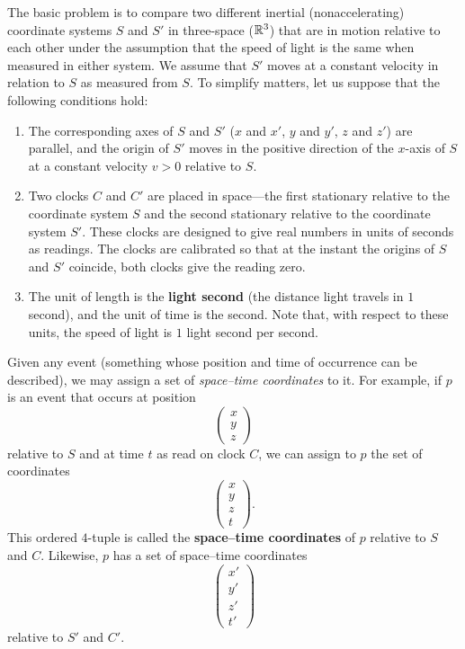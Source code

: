 \begin{defn}\label{6.9.1}
  The basic problem is to compare two different inertial (nonaccelerating) coordinate systems \(S\) and \(S'\) in three-space (\(\mathbb{R}^3\)) that are in motion relative to each other under the assumption that the speed of light is the same when measured in either system.
  We assume that \(S'\) moves at a constant velocity in relation to \(S\) as measured from \(S\).
  To simplify matters, let us suppose that the following conditions hold:
  \begin{enumerate}
    \item The corresponding axes of \(S\) and \(S'\) (\(x\) and \(x'\), \(y\) and \(y'\), \(z\) and \(z'\)) are parallel, and the origin of \(S'\) moves in the positive direction of the \(x\)-axis of \(S\) at a constant velocity \(v > 0\) relative to \(S\).
    \item Two clocks \(C\) and \(C'\) are placed in space---the first stationary relative to the coordinate system \(S\) and the second stationary relative to the coordinate system \(S'\).
          These clocks are designed to give real numbers in units of seconds as readings.
          The clocks are calibrated so that at the instant the origins of \(S\) and \(S'\) coincide, both clocks give the reading zero.
    \item The unit of length is the \textbf{light second} (the distance light travels in \(1\) second), and the unit of time is the second.
          Note that, with respect to these units, the speed of light is \(1\) light second per second.
  \end{enumerate}

  Given any event (something whose position and time of occurrence can be described), we may assign a set of \emph{space--time coordinates} to it.
  For example, if \(p\) is an event that occurs at position
  \[
    \begin{pmatrix}
      x \\
      y \\
      z
    \end{pmatrix}
  \]
  relative to \(S\) and at time \(t\) as read on clock \(C\), we can assign to \(p\) the set of coordinates
  \[
    \begin{pmatrix}
      x \\
      y \\
      z \\
      t
    \end{pmatrix}.
  \]
  This ordered \(4\)-tuple is called the \textbf{space--time coordinates} of \(p\) relative to \(S\) and \(C\).
  Likewise, \(p\) has a set of space--time coordinates
  \[
    \begin{pmatrix}
      x' \\
      y' \\
      z' \\
      t'
    \end{pmatrix}
  \]
  relative to \(S'\) and \(C'\).
\end{defn}

